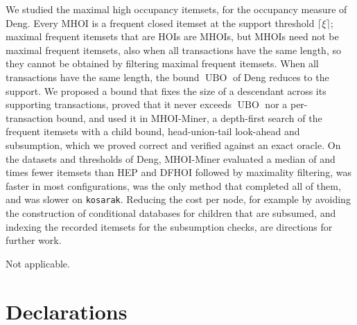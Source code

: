 \documentclass[pdflatex,sn-mathphys,Numbered]{sn-jnl}
\theoremstyle{thmstyleone}
\theoremstyle{thmstyletwo}
\theoremstyle{thmstylethree}
\newcommand{\ubo}{\operatorname{UBO}}
\newcommand{\Algo}{MHOI-Miner}
\begin{document}
We studied the maximal high occupancy itemsets, for the occupancy measure of Deng. Every MHOI is a frequent closed itemset at the support threshold $\lceil \xi \rceil$; maximal frequent itemsets that are HOIs are MHOIs, but MHOIs need not be maximal frequent itemsets, also when all transactions have the same length, so they cannot be obtained by filtering maximal frequent itemsets. When all transactions have the same length, the bound $\ubo$ of Deng reduces to the support. We proposed a bound that fixes the size of a descendant across its supporting transactions, proved that it never exceeds $\ubo$ nor a per-transaction bound, and used it in \Algo{}, a depth-first search of the frequent itemsets with a child bound, head-union-tail look-ahead and subsumption, which we proved correct and verified against an exact oracle. On the datasets and thresholds of Deng, \Algo{} evaluated a median of \MedianNodeReductionHep{} and \MedianNodeReductionDfhoi{} times fewer itemsets than HEP and DFHOI followed by maximality filtering, was faster in most configurations, was the only method that completed all of them, and was slower on \texttt{kosarak}. Reducing the cost per node, for example by avoiding the construction of conditional databases for children that are subsumed, and indexing the recorded itemsets for the subsumption checks, are directions for further work.

\backmatter

Not applicable.

\section*{Declarations}
\end{document}
